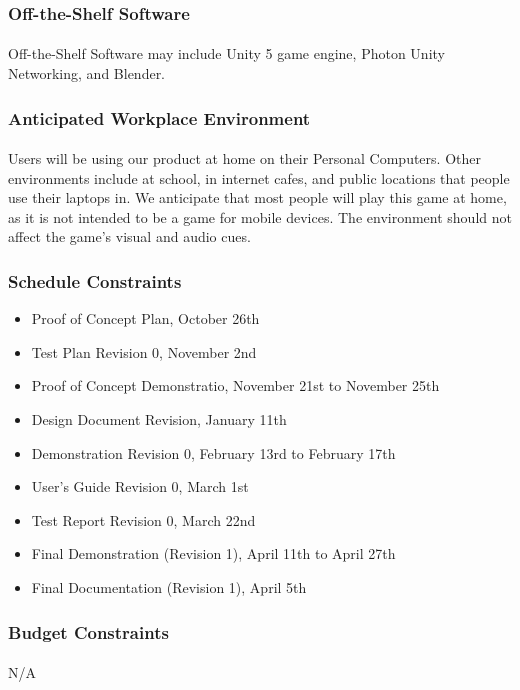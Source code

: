 \documentclass[12pt, titlepage]{article}
\begin{document}
\subsubsection{Off-the-Shelf Software}
\paragraph{}Off-the-Shelf Software may include Unity 5 game engine, Photon Unity Networking, and Blender.
\subsubsection{Anticipated Workplace Environment}
\paragraph{}Users will be using our product at home on their Personal Computers. Other environments include at school, in internet cafes, and public locations that people use their laptops in. We anticipate that most people will play this game at home, as it is not intended to be a game for mobile devices. The environment should not affect the game's visual and audio cues. 
\subsubsection{Schedule Constraints}
\begin{itemize}
    \item Proof of Concept Plan, October 26th
    \item Test Plan Revision 0, November 2nd
    \item Proof of Concept Demonstratio, November 21st to November 25th
    \item Design Document Revision, January 11th
    \item Demonstration Revision 0, February 13rd to February 17th
    \item User’s Guide Revision 0, March 1st
    \item Test Report Revision 0, March 22nd
    \item Final Demonstration (Revision 1), April 11th to April 27th
    \item Final Documentation (Revision 1), April 5th
\end{itemize}
\subsubsection{Budget Constraints}
\paragraph{}N/A
\end{document}
